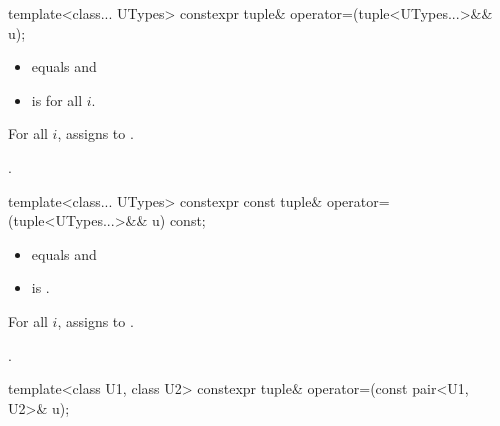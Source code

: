 \documentclass{wg21}
\begin{document}
%
\begin{itemdecl}
    template<class... UTypes> constexpr tuple& operator=(tuple<UTypes...>&& u);
\end{itemdecl}

\begin{itemdescr}
    \pnum
    \constraints
    \begin{itemize}
        \item {} equals  and
        \item {} is  for all $i$.
    \end{itemize}
    
    \pnum
    \effects
    For all $i$, assigns  to
    .
    
    \pnum
    \returns
    .
\end{itemdescr}

%
\begin{itemdecl}
    template<class... UTypes> constexpr const tuple& operator=(tuple<UTypes...>&& u) const;
\end{itemdecl}

\begin{itemdescr}
    \pnum
    \constraints
    \begin{itemize}
        \item
         equals  and
        \item
         is .
    \end{itemize}
    
    \pnum
    \effects
    For all $i$,
    assigns  to .
    
    \pnum
    \returns
    .
\end{itemdescr}

%
%
\begin{itemdecl}
    template<class U1, class U2> constexpr tuple& operator=(const pair<U1, U2>& u);
\end{itemdecl}
\end{document}
